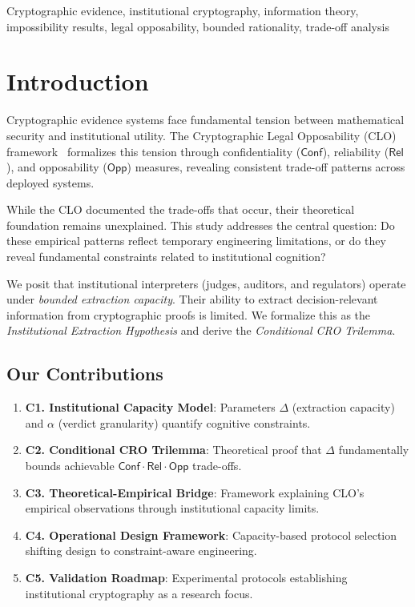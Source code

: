 \documentclass{ieeeaccess}
\newcommand{\Conf}{\mathsf{Conf}}
\newcommand{\Rel}{\mathsf{Rel}}
\newcommand{\Opp}{\mathsf{Opp}}
\begin{document}
\begin{keywords}
Cryptographic evidence, institutional cryptography, information theory, impossibility results, legal opposability, bounded rationality, trade-off analysis
\end{keywords}

\titlepgskip=-15pt
\maketitle

\section{Introduction}\label{sec:introduction}

Cryptographic evidence systems face fundamental tension between mathematical security and institutional utility. The Cryptographic Legal Opposability (CLO) framework~\cite{Minka2026CLO} formalizes this tension through confidentiality ($\Conf$), reliability ($\Rel$), and opposability ($\Opp$) measures, revealing consistent trade-off patterns across deployed systems.

While the CLO documented the trade-offs that occur, their theoretical foundation remains unexplained. This study addresses the central question: Do these empirical patterns reflect temporary engineering limitations, or do they reveal fundamental constraints related to institutional cognition?

We posit that institutional interpreters (judges, auditors, and regulators) operate under \emph{bounded extraction capacity}. Their ability to extract decision-relevant information from cryptographic proofs is limited. We formalize this as the \emph{Institutional Extraction Hypothesis} and derive the \emph{Conditional CRO Trilemma}.

\subsection{Our Contributions}

\begin{enumerate}
\item \textbf{C1. Institutional Capacity Model}: Parameters $\Delta$ (extraction capacity) and $\alpha$ (verdict granularity) quantify cognitive constraints.

\item \textbf{C2. Conditional CRO Trilemma}: Theoretical proof that $\Delta$ fundamentally bounds achievable $\Conf\cdot\Rel\cdot\Opp$ trade-offs.

\item \textbf{C3. Theoretical-Empirical Bridge}: Framework explaining CLO's empirical observations through institutional capacity limits.

\item \textbf{C4. Operational Design Framework}: Capacity-based protocol selection shifting design to constraint-aware engineering.

\item \textbf{C5. Validation Roadmap}: Experimental protocols establishing institutional cryptography as a research focus.
\end{enumerate}
\end{document}
